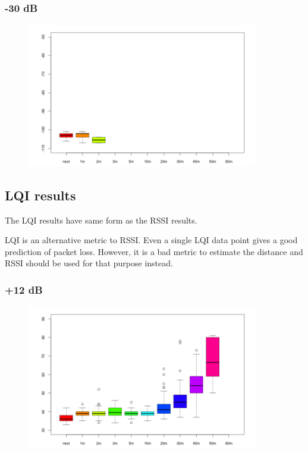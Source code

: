 \subsubsection{-30 dB}

\begin{figure}[H]
  \centering
  \includegraphics[width=0.9\textwidth]{img/tests/rssi/db_m30.png}
\end{figure}

\subsection{LQI results}
The LQI results have same form as the RSSI results.

LQI is an alternative metric to RSSI.
Even a single LQI data point gives a good prediction of packet loss.
However, it is a bad metric to estimate the distance and RSSI should be used for that purpose instead.


\subsubsection{+12 dB}

\begin{figure}[H]
  \centering
  \includegraphics[width=0.9\textwidth]{img/tests/lqi/db_12.png}
\end{figure}


